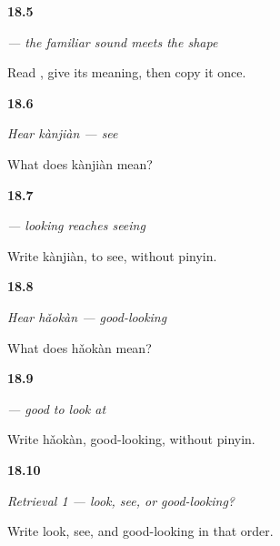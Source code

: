 \noindent\begin{minipage}[t]{\linewidth}
\raggedright
\hypertarget{review-ZH-C18-kan-read-write}{\textbf{18.5}} \emph{ — the familiar sound meets the shape}\par
\small Read , give its meaning, then copy it once.
\end{minipage}\par\medskip

\noindent\begin{minipage}[t]{\linewidth}
\raggedright
\hypertarget{review-ZH-C18-hear-kanjian-meaning}{\textbf{18.6}} \emph{Hear \emph{kànjiàn} — see}\par
\small What does kànjiàn mean?
\end{minipage}\par\medskip

\noindent\begin{minipage}[t]{\linewidth}
\raggedright
\hypertarget{review-ZH-C18-kanjian-write}{\textbf{18.7}} \emph{ — looking reaches seeing}\par
\small Write kànjiàn, to see, without pinyin.
\end{minipage}\par\medskip

\noindent\begin{minipage}[t]{\linewidth}
\raggedright
\hypertarget{review-ZH-C18-hear-haokan-meaning}{\textbf{18.8}} \emph{Hear \emph{hǎokàn} — good-looking}\par
\small What does hǎokàn mean?
\end{minipage}\par\medskip

\noindent\begin{minipage}[t]{\linewidth}
\raggedright
\hypertarget{review-ZH-C18-haokan-write}{\textbf{18.9}} \emph{ — good to look at}\par
\small Write hǎokàn, good-looking, without pinyin.
\end{minipage}\par\medskip

\noindent\begin{minipage}[t]{\linewidth}
\raggedright
\hypertarget{review-ZH-R18-looking-three-r1-order}{\textbf{18.10}} \emph{Retrieval 1 — look, see, or good-looking?}\par
\small Write look, see, and good-looking in that order.
\end{minipage}\par\medskip

